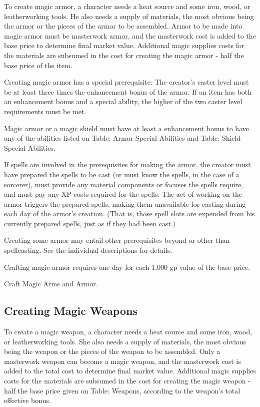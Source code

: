 To create magic armor, a character needs a heat source and some iron, wood, or leatherworking tools. He also needs a supply of materials, the most obvious being the armor or the pieces of the armor to be assembled. Armor to be made into magic armor must be masterwork armor, and the masterwork cost is added to the base price to determine final market value. Additional magic supplies costs for the materials are subsumed in the cost for creating the magic armor - half the base price of the item.

Creating magic armor has a special prerequisite: The creator's caster level must be at least three times the enhancement bonus of the armor. If an item has both an enhancement bonus and a special ability, the higher of the two caster level requirements must be met.

Magic armor or a magic shield must have at least a  enhancement bonus to have any of the abilities listed on Table: Armor Special Abilities and Table: Shield Special Abilities.

If spells are involved in the prerequisites for making the armor, the creator must have prepared the spells to be cast (or must know the spells, in the case of a sorcerer), must provide any material components or focuses the spells require, and must pay any XP costs required for the spells. The act of working on the armor triggers the prepared spells, making them unavailable for casting during each day of the armor's creation. (That is, those spell slots are expended from his currently prepared spells, just as if they had been cast.)

Creating some armor may entail other prerequisites beyond or other than spellcasting. See the individual descriptions for details.

Crafting magic armor requires one day for each 1,000 gp value of the base price.

 Craft Magic Arms and Armor.

\subsection{Creating Magic Weapons}

To create a magic weapon, a character needs a heat source and some iron, wood, or leatherworking tools. She also needs a supply of materials, the most obvious being the weapon or the pieces of the weapon to be assembled. Only a masterwork weapon can become a magic weapon, and the masterwork cost is added to the total cost to determine final market value. Additional magic supplies costs for the materials are subsumed in the cost for creating the magic weapon - half the base price given on Table: Weapons, according to the weapon's total effective bonus.


